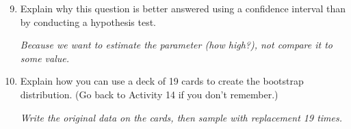 \begin{enumerate}
 \setcounter{enumi}{8}
\item  Explain why this question is better answered using a confidence
  interval than by conducting a hypothesis test. 
\begin{students}
  \vspace{1cm}
\end{students}
\begin{key}
  {\it  Because we want to estimate the parameter (how high?), not
    compare it to some value.}
\end{key}

\item  Explain how you can use a deck of 19 cards to create the
  bootstrap distribution. (Go back to Activity 14 if you don't remember.)
\begin{students}
  \vspace{1cm}
\end{students}
\begin{key}
  {\it Write the original data on the cards, then sample with replacement 19
    times.}
\end{key}


  


\end{enumerate}
